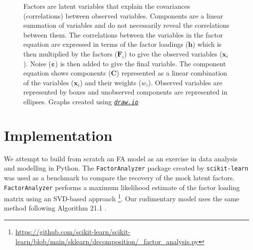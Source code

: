\documentclass[12pt, letterpaper]{article}
\begin{document}
    
    \begin{figure}
        \centering
        \quad\quad\quad\quad\quad
        \caption{Factors are latent variables that explain the covariances (correlations) between observed variables. Components are a linear summation of variables and do not necessarily reveal the correlations between them. The correlations between the variables in the factor equation are expressed in terms of the factor loadings ($\mathbf{\mathbf{h}}$) which is then multiplied by the factors ($\mathit{\mathbf{F}_i}$) to give the observed variables ($\mathbf{x}_i$). Noise ($\mathbf{\varepsilon}$) is then added to give the final variable. The component equation shows components ($\mathit{\mathbf{C}}$) represented as a linear combination of the variables ($\mathit{\mathbf{x}_i}$) and their weights ($\mathit{w_i}$). Observed variables are represented by boxes and unobserved components are represented in ellipses. Graphs created using \href{http://draw.io}{\emph{\texttt{draw.io}}}}%
        \label{fig:pca_vs_fa}
    \end{figure}

\section{Implementation}

We attempt to build from scratch an FA model as an exercise in data analysis and modelling in Python. The \texttt{FactorAnalyzer} package created by \texttt{scikit-learn} was used as a benchmark to compare the recovery of the mock latent factors. \texttt{FactorAnalyzer} performs a maximum likelihood estimate of the factor loading matrix using an SVD-based approach \citep{scikit-learn} \footnote{\url{https://github.com/scikit-learn/scikit-learn/blob/main/sklearn/decomposition/_factor_analysis.py}}. Our rudimentary model uses the same method following Algorithm 21.1 \citep{barber_2018}.
\end{document}
